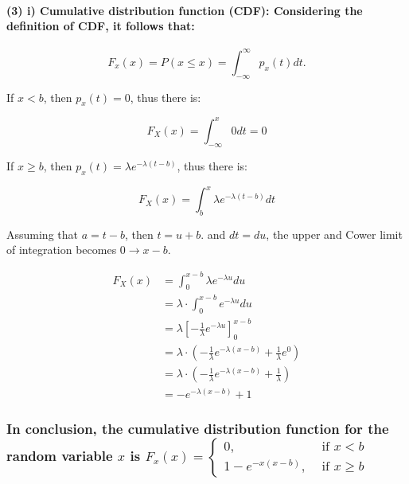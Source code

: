 \documentclass[
]{article}
\begin{document}
\paragraph{(3) i) Cumulative distribution function (CDF): Considering
the definition of CDF, it follows
that:}\label{i-cumulative-distribution-function-cdf-considering-the-definition-of-cdf-it-follows-that}

\[
\begin{equation*}
F_{x}(x)=P(x \leqslant x)=\int_{-\infty}^{\infty} p_{x}(t) d t . \tag{1}
\end{equation*}
\]

If \(x<b\), then \(p_{x}(t)=0\), thus there is:

\[
\begin{equation*}
F_{X}(x)=\int_{-\infty}^{x} 0 d t=0 \tag{2}
\end{equation*}
\]

If \(x \geqslant b\), then \(p_{x}(t)=\lambda e^{-\lambda(t-b)}\), thus
there is:

\[
\begin{equation*}
F_{X}(x)=\int_{b}^{x} \lambda e^{-\lambda(t-b)} d t \tag{3}
\end{equation*}
\]

Assuming that \(a=t-b\), then \(t=u+b\). and \(d t=d u\), the upper and
Cower limit of integration becomes \(0 \rightarrow x-b\).

\[
\begin{aligned}
F_{X}(x) & =\int_{0}^{x-b} \lambda e^{-\lambda u} d u \\
& =\lambda \cdot \int_{0}^{x-b} e^{-\lambda u} d u \\
& =\lambda\left[-\frac{1}{\lambda} e^{-\lambda u}\right]_{0}^{x-b} \\
& =\lambda \cdot\left(-\frac{1}{\lambda} e^{-\lambda(x-b)}+\frac{1}{\lambda} e^{0}\right) \\
& =\lambda \cdot\left(-\frac{1}{\lambda} e^{-\lambda(x-b)}+\frac{1}{\lambda}\right) \\
& =-e^{-\lambda(x-b)}+1 
\end{aligned}
\]

\subsubsection{\texorpdfstring{In conclusion, the cumulative
distribution function for the random variable \(x\) is
\(F_{x}(x)= \begin{cases}0, & \text { if } x<b \\ 1-e^{-x(x-b)}, & \text { if } x \geqslant b\end{cases}\)}{In conclusion, the cumulative distribution function for the random variable x is F\_\{x\}(x)= \textbackslash begin\{cases\}0, \& \textbackslash text \{ if \} x\textless b \textbackslash\textbackslash{} 1-e\^{}\{-x(x-b)\}, \& \textbackslash text \{ if \} x \textbackslash geqslant b\textbackslash end\{cases\}}}\label{in-conclusion-the-cumulative-distribution-function-for-the-random-variable-x-is-f_xx-begincases0-text-if-xb-1-e-xx-b-text-if-x-geqslant-bendcases}
\end{document}
